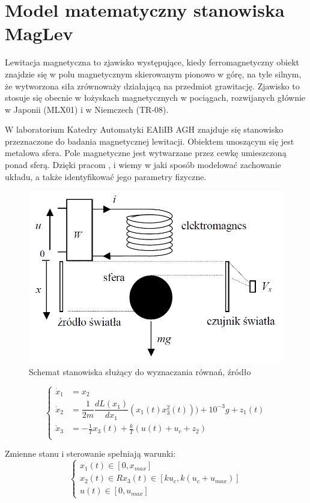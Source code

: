 \section{Model matematyczny stanowiska MagLev}

Lewitacja magnetyczna to zjawisko występujące, kiedy ferromagnetyczny obiekt znajdzie się w polu magnetycznym skierowanym pionowo w górę, na tyle silnym, że wytworzona siła zrównoważy działającą na przedmiot grawitację. Zjawisko to stosuje się obecnie w łożyskach magnetycznych w pociągach, rozwijanych głównie w Japonii (MLX01) i w Niemczech (TR-08).

W laboratorium Katedry Automatyki EAIiIB AGH znajduje się stanowisko przeznaczone do badania magnetycznej lewitacji. Obiektem unoszącym się jest metalowa sfera. Pole magnetyczne jest wytwarzane przez cewkę umieszczoną ponad sferą. Dzięki pracom \cite{Bania1999}, \cite{Bania200.} i \cite{Pilat} wiemy w jaki sposób modelować zachowanie układu, a także identyfikować jego parametry fizyczne.

\begin{figure}[!htb]
\centering
\includegraphics[scale=0.45]{img/model-rownania.PNG}
\caption{Schemat stanowiska służący do wyznaczania równań, źródło \cite{Bania200.}}
\label{rys:model-rownania}
\end{figure}

\begin{equation}
  \begin{cases}
    \dot x_1 & = x_2 \\
    \dot x_2 & = \dfrac{1}{2m} \dfrac{dL(x_1)}{dx_1} (x_1(t) x_3^2(t))) + 10^{-3} g + z_1(t)  \\
    \dot x_3 & = -\frac{1}{T} x_3(t) + \frac{k}{T} (u(t) + u_c + z_2) \\
  \end{cases}  
\end{equation}

Zmienne stanu i sterowanie spełniają warunki:
\begin{equation}
\begin{cases}
x_1(t) \in [0, x_{max}] \\
x_2(t) \in R
x_3(t) \in [ku_c, k(u_c+u_{max})] \\
u(t) \in [0, u_{max}]
\end{cases}
\end{equation}



